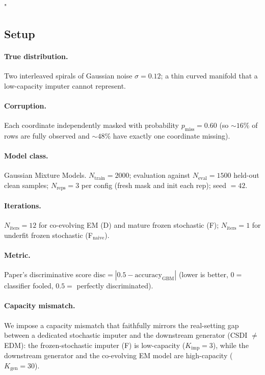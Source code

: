 "\documentclass{article}
\theoremstyle{plain}
\theoremstyle{definition}
\theoremstyle{remark}
\begin{document}
\subsection{Setup}
\label{app:toy-setup}

\paragraph{True distribution.}
Two interleaved spirals of Gaussian noise $\sigma = 0.12$; a thin curved manifold that a low-capacity imputer cannot represent.

\paragraph{Corruption.}
Each coordinate independently masked with probability $p_{\mathrm{miss}} = 0.60$ (so ${\sim}16\%$ of rows are fully observed and ${\sim}48\%$ have exactly one coordinate missing).

\paragraph{Model class.}
Gaussian Mixture Models. $N_{\mathrm{train}} = 2000$; evaluation against $N_{\mathrm{eval}} = 1500$ held-out clean samples; $N_{\mathrm{reps}} = 3$ per config (fresh mask and init each rep); seed $= 42$.

\paragraph{Iterations.}
$N_{\mathrm{iters}} = 12$ for co-evolving EM (D) and mature frozen stochastic (F); $N_{\mathrm{iters}} = 1$ for underfit frozen stochastic (F$_{\mathrm{naive}}$).

\paragraph{Metric.}
Paper's discriminative score $\mathrm{disc} = |0.5 - \mathrm{accuracy}_{\mathrm{GBM}}|$ (lower is better, $0 =$ classifier fooled, $0.5 =$ perfectly discriminated).

\paragraph{Capacity mismatch.}
We impose a capacity mismatch that faithfully mirrors the real-setting gap between a dedicated stochastic imputer and the downstream generator (CSDI $\neq$ EDM): the frozen-stochastic imputer (F) is low-capacity ($K_{\mathrm{imp}} = 3$), while the downstream generator and the co-evolving EM model are high-capacity ($K_{\mathrm{gen}} = 30$).
\end{document}
